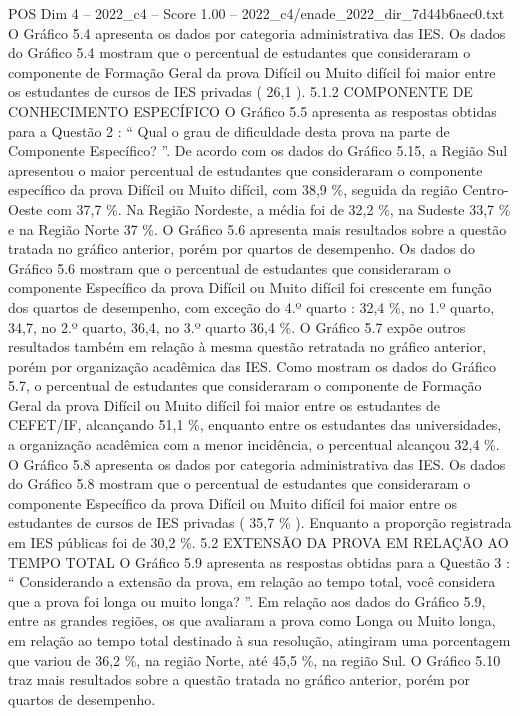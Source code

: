 \begin{textsample}{POS Dim 4 – 2022\_c4 – Score 1.00 – 2022\_c4/enade\_2022\_dir\_7d44b6aec0.txt}
O Gráfico 5.4 apresenta os dados por categoria administrativa das IES.
Os dados do Gráfico 5.4 mostram que o percentual de estudantes que consideraram o componente de Formação Geral da prova Difícil ou Muito difícil foi maior entre os estudantes de cursos de IES privadas ( 26,1 ). 5.1.2 COMPONENTE DE CONHECIMENTO ESPECÍFICO O Gráfico 5.5 apresenta as respostas obtidas para a Questão 2 : “ Qual o grau de dificuldade desta prova na parte de Componente Específico? ”.
De acordo com os dados do Gráfico 5.15, a Região Sul apresentou o maior percentual de estudantes que consideraram o componente específico da prova Difícil ou Muito difícil, com 38,9 \%, seguida da região Centro-Oeste com 37,7 \%.
Na Região Nordeste, a média foi de 32,2 \%, na Sudeste 33,7 \% e na Região Norte 37 \%.
O Gráfico 5.6 apresenta mais resultados sobre a questão tratada no gráfico anterior, porém por quartos de desempenho.
Os dados do Gráfico 5.6 mostram que o percentual de estudantes que consideraram o componente Específico da prova Difícil ou Muito difícil foi crescente em função dos quartos de desempenho, com exceção do 4.º quarto : 32,4 \%, no 1.º quarto, 34,7, no 2.º quarto, 36,4, no 3.º quarto 36,4 \%.
O Gráfico 5.7 expõe outros resultados também em relação à mesma questão retratada no gráfico anterior, porém por organização acadêmica das IES.
Como mostram os dados do Gráfico 5.7, o percentual de estudantes que consideraram o componente de Formação Geral da prova Difícil ou Muito difícil foi maior entre os estudantes de CEFET/IF, alcançando 51,1 \%, enquanto entre os estudantes das universidades, a organização acadêmica com a menor incidência, o percentual alcançou 32,4 \%.
O Gráfico 5.8 apresenta os dados por categoria administrativa das IES.
Os dados do Gráfico 5.8 mostram que o percentual de estudantes que consideraram o componente Específico da prova Difícil ou Muito difícil foi maior entre os estudantes de cursos de IES privadas ( 35,7 \% ).
Enquanto a proporção registrada em IES públicas foi de 30,2 \%. 5.2 EXTENSÃO DA PROVA EM RELAÇÃO AO TEMPO TOTAL O Gráfico 5.9 apresenta as respostas obtidas para a Questão 3 : “ Considerando a extensão da prova, em relação ao tempo total, você considera que a prova foi longa ou muito longa? ”.
Em relação aos dados do Gráfico 5.9, entre as grandes regiões, os que avaliaram a prova como Longa ou Muito longa, em relação ao tempo total destinado à sua resolução, atingiram uma porcentagem que variou de 36,2 \%, na região Norte, até 45,5 \%, na região Sul.
O Gráfico 5.10 traz mais resultados sobre a questão tratada no gráfico anterior, porém por quartos de desempenho.

\end{textsample}

